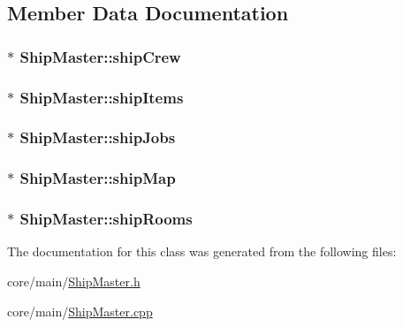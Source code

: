 \subsection{Member Data Documentation}
\hypertarget{classShipMaster_a7f0c72b72e582c85dd582a1ffdceabdb}{
\subsubsection[{ship\-Crew}]{$\ast$ Ship\-Master\-::ship\-Crew}}\label{classShipMaster_a7f0c72b72e582c85dd582a1ffdceabdb}
\hypertarget{classShipMaster_a9eedfb4e38a7b7db557ce2d1330bfe4e}{
\subsubsection[{ship\-Items}]{$\ast$ Ship\-Master\-::ship\-Items}}\label{classShipMaster_a9eedfb4e38a7b7db557ce2d1330bfe4e}
\hypertarget{classShipMaster_a1a204eb61598354bc650c3322d132a33}{
\subsubsection[{ship\-Jobs}]{$\ast$ Ship\-Master\-::ship\-Jobs}}\label{classShipMaster_a1a204eb61598354bc650c3322d132a33}
\hypertarget{classShipMaster_ad9033bf87a43b439646616bbc92dfe03}{
\subsubsection[{ship\-Map}]{$\ast$ Ship\-Master\-::ship\-Map}}\label{classShipMaster_ad9033bf87a43b439646616bbc92dfe03}
\hypertarget{classShipMaster_a8a39f20c1107f8d6f6c081817e40dbfd}{
\subsubsection[{ship\-Rooms}]{$\ast$ Ship\-Master\-::ship\-Rooms}}\label{classShipMaster_a8a39f20c1107f8d6f6c081817e40dbfd}


The documentation for this class was generated from the following files\-:\begin{DoxyCompactItemize}
\item 
core/main/\hyperlink{ShipMaster_8h}{Ship\-Master.\-h}\item 
core/main/\hyperlink{ShipMaster_8cpp}{Ship\-Master.\-cpp}\end{DoxyCompactItemize}
